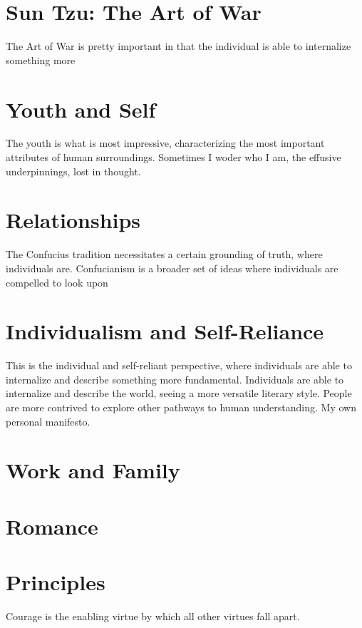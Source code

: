 \documentclass[12pt,letterpaper]{article}
\begin{document}
\section{Sun Tzu: The Art of War}
The Art of War is pretty important in that the individual is able to internalize something more 

\section{Youth and Self}

The youth is what is most impressive, characterizing the most important attributes of human surroundings.  Sometimes I woder who I am, the effusive underpinnings, lost in thought.

\section{Relationships}
The Confucius tradition necessitates a certain grounding of truth, where individuals are.  Confucianism is a broader set of ideas where individuals are compelled to look upon

\section{Individualism and Self-Reliance}
This is the individual and self-reliant perspective, where individuals are able to internalize and describe something more fundamental.  Individuals are able to internalize and describe the world, seeing a more versatile literary style.  People are more contrived to explore other pathways to human understanding.  My own personal manifesto.

\section{Work and Family}

\section{Romance}

\section{Principles}
Courage is the enabling virtue by which all other virtues fall apart. 
\end{document}
